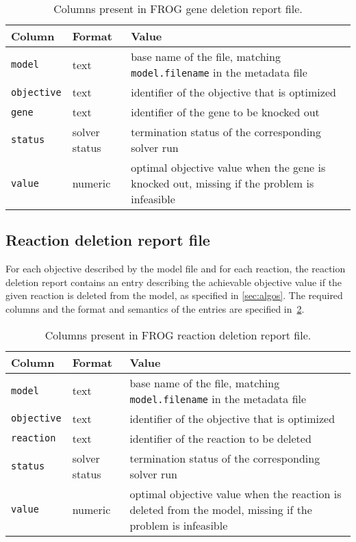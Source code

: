 \begin{table}\tablefont
\begin{tabular}{llp{30em}}
\toprule
Column & Format & Value \\
\midrule
\verb|model|
 & text
 & base name of the file, matching \verb|model.filename| in the metadata file
 \\
\verb|objective|
 & text
 & identifier of the objective that is optimized
 \\
\verb|gene|
 & text
 & identifier of the gene to be knocked out
 \\
\verb|status|
 & solver status
 & termination status of the corresponding solver run
 \\
\verb|value|
 & numeric
 & optimal objective value when the gene is knocked out, missing if the problem is infeasible
 \\
\bottomrule
\end{tabular}
\caption{Columns present in FROG gene deletion report file.}
\label{tab:genefields}
\end{table}

\subsection{Reaction deletion report file}
\label{sec:rxns}

For each objective described by the model file and for each reaction, the reaction deletion report contains an entry describing the achievable objective value if the given reaction is deleted from the model, as specified in \cref{sec:algos}. The required columns and the format and semantics of the entries are specified in~\cref{tab:rxnsfields}.

\begin{table}\tablefont
\begin{tabular}{llp{30em}}
\toprule
Column & Format & Value \\
\midrule
\verb|model|
 & text
 & base name of the file, matching \verb|model.filename| in the metadata file
 \\
\verb|objective|
 & text
 & identifier of the objective that is optimized
 \\
\verb|reaction|
 & text
 & identifier of the reaction to be deleted
 \\
\verb|status|
 & solver status
 & termination status of the corresponding solver run
 \\
\verb|value|
 & numeric
 & optimal objective value when the reaction is deleted from the model, missing if the problem is infeasible
 \\
\bottomrule
\end{tabular}
\caption{Columns present in FROG reaction deletion report file.}
\label{tab:rxnsfields}
\end{table}
